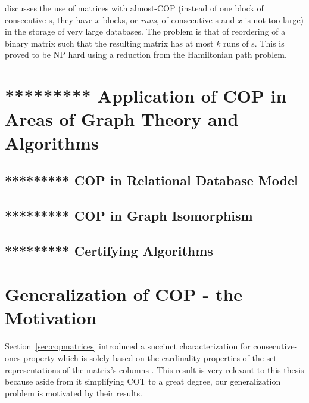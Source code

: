 \documentclass[MS]             %
              {iitmdiss_as}    %
\begin{document}
\cite{jkckv04} discusses the use of matrices with almost-COP (instead
of one block of consecutive {\un}s, they have $x$ blocks, or {\em
  runs}, of consecutive {\un}s and $x$ is not too large) in the
storage of very large databases.  The problem is that of reordering of
a binary matrix such that the resulting matrix has at most $k$ runs of
{\un}s. This is proved to be NP hard using a reduction from the
Hamiltonian path problem.
  



\section{********* Application of COP in Areas of Graph Theory and
  Algorithms}
\label{sec:appcopGTA}

\subsection{********* COP in Relational Database Model}
\label{sec:apprdbm}

\subsection{********* COP in Graph Isomorphism}
\label{sec:appgraphiso}

\subsection{********* Certifying Algorithms}
\label{sec:appcertalgo}


\section{Generalization of COP - the Motivation}
\label{sec:motive}
Section~\ref{sec:copmatrices} introduced a succinct characterization
for consecutive-ones property which is solely based on the cardinality
properties of the set representations of the matrix's columns
\cite{nsnrs09}. This result is very relevant to this thesis because
aside from it simplifying COT to a great degree, our generalization
problem is motivated by their results.
\end{document}
